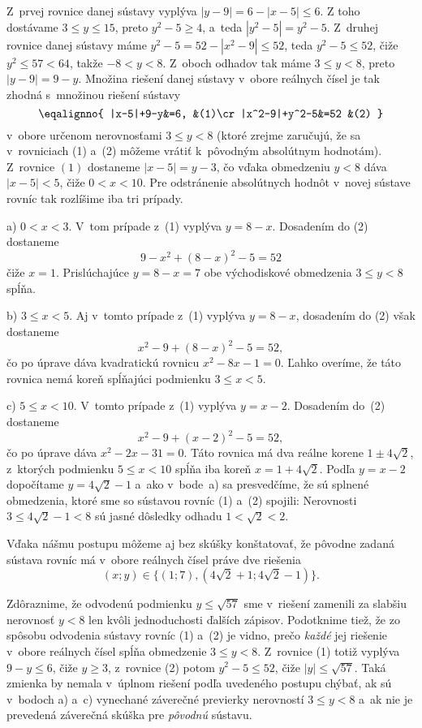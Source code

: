 {%
Z~prvej rovnice danej sústavy vyplýva $|y-9|=6-|x-5|\le 6$. Z toho dostávame $3\le y\le
15$, preto $y^2-5\ge 4$, a~teda $|y^2-5|=y^2-5$.
Z~druhej rovnice danej sústavy máme
$y^2-5=52-|x^2-9|\le52$, teda $y^2-5\le 52$, čiže $y^2\le57<64$, takže
$-8<y<8$. Z~oboch odhadov tak máme $3\le y<8$, preto $|y-9|=9-y$. Množina riešení danej
sústavy v~obore reálnych čísel je tak zhodná s~množinou riešení sústavy
$$
\eqalignno{
|x-5|+9-y&=6, &(1)\cr
|x^2-9|+y^2-5&=52 &(2)
}
$$
v~obore určenom nerovnosťami $3\le y<8$
(ktoré zrejme zaručujú, že sa v~rovniciach (1) a~(2) môžeme vrátiť
k~pôvodným absolútnym hodnotám).
Z~rovnice $(1)$ dostaneme $|x-5|=y-3$, čo vďaka obmedzeniu $y<8$ dáva $|x-5|<5$,
čiže $0<x<10$. Pre odstránenie
absolútnych hodnôt v~novej sústave rovníc tak rozlíšime iba
tri prípady.

\ite a) $0<x<3$. V~tom prípade z~(1) vyplýva $y=8-x$. Dosadením do (2) dostaneme
$$
9-x^2+(8-x)^2-5=52
$$
čiže $x=1$. Prislúchajúce $y=8-x=7$ obe východiskové obmedzenia $3\le y<8$ spĺňa.

\ite b) $3\le x<5$. Aj v~tomto prípade z~(1) vyplýva $y=8-x$, dosadením do (2) však dostaneme
$$
x^2-9+(8-x)^2-5=52,
$$
čo po úprave dáva kvadratickú rovnicu $x^2-8x-1=0$.
Ľahko overíme, že táto rovnica nemá koreň spĺňajúci
podmienku $3\le x<5$.

\ite c) $5\le x<10$. V~tomto prípade z~(1) vyplýva $y=x-2$. Dosadením do~(2) dostaneme
$$
x^2-9+(x-2)^2-5=52,
$$
čo po úprave dáva $x^2-2x-31=0$. Táto rovnica má dva reálne korene $1\pm4\sqrt2$,
z~ktorých podmienku $5\le x<10$ spĺňa iba koreň $x=1+4\sqrt2$.
Podľa $y=x-2$ dopočítame $y=4\sqrt2-1$ a~ako v~bode~a) sa
presvedčíme, že sú splnené obmedzenia, ktoré sme so sústavou
rovníc (1) a~(2) spojili: Nerovnosti
$
3\le4\sqrt2-1<8
$
sú jasné dôsledky odhadu $1<\sqrt2<2$.

\medskip
Vďaka nášmu postupu môžeme aj bez skúšky konštatovať, že pôvodne zadaná
sústava rovníc má v~obore reálnych čísel práve dve riešenia
$$
(x;y)\in\{(1;7),(4\sqrt2+1;4\sqrt2-1)\}.
$$

\poznamka
Zdôraznime, že odvodenú podmienku $y\le\sqrt{57}$
sme v~riešení zamenili za slabšiu nerovnosť $y<8$ len kvôli jednoduchosti
ďalších zápisov. Podotknime tiež, že zo spôsobu odvodenia sústavy rovníc
(1) a~(2) je vidno, prečo {\it každé\/} jej riešenie v~obore reálnych čísel
spĺňa obmedzenie $3\le y<8$. Z~rovnice (1) totiž vyplýva $9-y\le 6$,
čiže $y\ge3$,
z~rovnice (2) potom $y^2-5\le52$, čiže $|y|\le\sqrt{57}$.
Taká zmienka by nemala v~úplnom riešení podľa
uvedeného postupu chýbať, ak sú v~bodoch a) a~c) vynechané záverečné
previerky nerovností $3\le y<8$ a~ak nie je prevedená záverečná skúška
pre {\it pôvodnú\/} sústavu.


}
